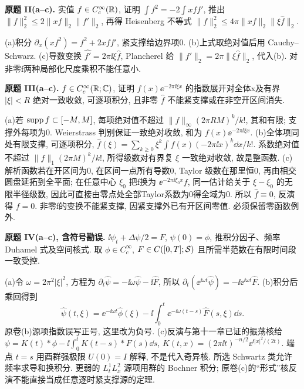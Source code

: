\begin{exercise}\label{ps:10II}
\textbf{原题 II(a--c).} 实值 $f\in C_c^\infty(\mathbb R)$, 证明 $\int f^2=-2\int xff'$, 推出 $\|f\|_2^2\le2\|xf\|_2\|f'\|_2$, 再得 Heisenberg 不等式 $\|f\|_2^2\le4\pi\|xf\|_2\|\xi\widehat f\|_2$.
\end{exercise}
\begin{solution}
(a)积分 $\partial_x(xf^2)=f^2+2xff'$, 紧支撑给边界项0.
(b)上式取绝对值后用 Cauchy--Schwarz.
(c)导数变换 $\widehat{f'}=2\pi\ii\xi\widehat f$, Plancherel 给 $\|f'\|_2=2\pi\|\xi\widehat f\|_2$, 代入(b). 对非零f两种局部化尺度乘积不能任意小.
\end{solution}
\begin{exercise}\label{ps:10III}
\textbf{原题 III(a--c).} $f\in C_c^\infty(\mathbb R;\mathbb C)$, 证明 $f(x)\ee^{-2\pi\ii\xi x}$ 的指数展开对全体x及有界 $|\xi|<R$ 绝对一致收敛, 可逐项积分, 且非零 $\widehat f$ 不能紧支撑或在非空开区间消失.
\end{exercise}
\begin{solution}
(a)若 $\operatorname{supp} f\subset[-M,M]$, 每项绝对值不超过 $\|f\|_\infty(2\pi RM)^k/k!$, 其和有限; 支撑外每项为0. Weierstrass 判别保证一致绝对收敛, 和为 $f(x)\ee^{-2\pi\ii\xi x}$.
(b)全体项同处有限支撑, 可逐项积分,
$\widehat f(\xi)=\sum_{k\ge0}\xi^k\int f(x)(-2\pi\ii x)^k\dd x/k!$.
系数绝对值不超过 $\|f\|_1(2\pi M)^k/k!$, 所得级数对有界复 $\xi$ 一致绝对收敛, 故是整函数.
(c)解析函数若在开区间为0, 在区间一点所有导数0, Taylor 级数在那里恒0, 再由相交圆盘延拓到全平面; 在任意中心 $\xi_0$ 把f换为 $\ee^{-2\pi\ii\xi_0x}f$, 同一估计给关于 $\xi-\xi_0$ 的无限半径级数, 因此可直接由零点处全部Taylor系数为0得全域为0. 所以 $\widehat f\equiv0$, 反演得 $f=0$. 非零f的变换不能紧支撑, 因紧支撑外已有开区间零值. 必须保留零函数例外.
\end{solution}
\begin{exercise}\label{ps:10IV}
\textbf{原题 IV(a--c), 含符号勘误.} $\ii\psi_t+\Delta\psi/2=F$, $\psi(0)=\phi$, 推积分因子、频率 Duhamel 式及空间核式. 取 $\phi\in C_c^\infty$, $F\in C([0,T];\mathcal S)$ 且所需半范数在有限时间段一致受控.
\end{exercise}
\begin{solution}
(a)令 $\omega=2\pi^2|\xi|^2$, 方程为 $\partial_t\widehat\psi=-\ii\omega\widehat\psi-\ii\widehat F$, 所以 $\partial_t(\ee^{\ii\omega t}\widehat\psi)=-\ii\ee^{\ii\omega t}\widehat F$.
(b)积分后乘回得到
\[
\widehat\psi(t,\xi)=\ee^{-\ii\omega t}\widehat\phi(\xi)-\ii\int_0^t\ee^{-\ii\omega(t-s)}\widehat F(s,\xi)\dd s.
\]
原卷(b)源项指数误写正号, 这里改为负号.
(c)反演与第十一章已证的振荡核给
$\psi=K(t)*\phi-\ii\int_0^tK(t-s)*F(s)\dd s$,
$K(t,x)=(2\pi\ii t)^{-n/2}\ee^{\ii|x|^2/(2t)}$.
端点 $t=s$ 用酉群强极限 $U(0)=I$ 解释, 不是代入奇异核. 所选 Schwartz 类允许频率求导和换积分. 更弱的 $L^1_tL^2_x$ 源项用群的 Bochner 积分; 原卷(c)的“形式”核反演不能直接当成任意逐时紧支撑源的定理.
\end{solution}
